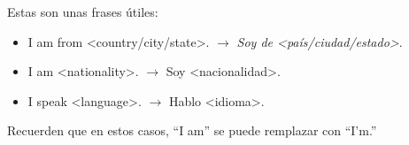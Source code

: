 Estas son unas frases útiles:
\begin{itemize}
	\item I am from <country/city/state>. $\rightarrow$ \emph{Soy de <país/ciudad/estado>}.
	\item I am <nationality>. $\rightarrow$ Soy <nacionalidad>.
	\item I speak <language>. $\rightarrow$ Hablo <idioma>.
\end{itemize}

Recuerden que en estos casos, ``I am'' se puede remplazar con ``I'm.''\\
